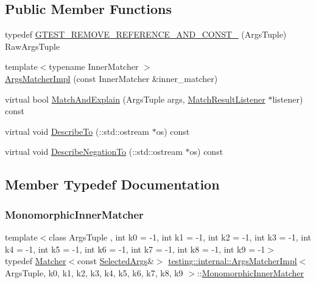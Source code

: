 \subsection*{Public Member Functions}
\begin{DoxyCompactItemize}
\item 
typedef \hyperlink{classtesting_1_1internal_1_1_args_matcher_impl_a7b0cadc369c0c20cd254cc2052782301}{G\+T\+E\+S\+T\+\_\+\+R\+E\+M\+O\+V\+E\+\_\+\+R\+E\+F\+E\+R\+E\+N\+C\+E\+\_\+\+A\+N\+D\+\_\+\+C\+O\+N\+S\+T\+\_\+} (Args\+Tuple) Raw\+Args\+Tuple
\item 
{\footnotesize template$<$typename Inner\+Matcher $>$ }\\\hyperlink{classtesting_1_1internal_1_1_args_matcher_impl_a7f7a9a826d130d11fe30633d79f59a06}{Args\+Matcher\+Impl} (const Inner\+Matcher \&inner\+\_\+matcher)
\item 
virtual bool \hyperlink{classtesting_1_1internal_1_1_args_matcher_impl_a60383b3073a61f9d82cbf31fe19e6bfa}{Match\+And\+Explain} (Args\+Tuple args, \hyperlink{classtesting_1_1_match_result_listener}{Match\+Result\+Listener} $\ast$listener) const
\item 
virtual void \hyperlink{classtesting_1_1internal_1_1_args_matcher_impl_a8e057f67b368f7d94aeb0ddd35837c94}{Describe\+To} (\+::std\+::ostream $\ast$os) const
\item 
virtual void \hyperlink{classtesting_1_1internal_1_1_args_matcher_impl_ac8ff5369879836567cedb5434bcca5b9}{Describe\+Negation\+To} (\+::std\+::ostream $\ast$os) const
\end{DoxyCompactItemize}


\subsection{Member Typedef Documentation}
\mbox{\label{classtesting_1_1internal_1_1_args_matcher_impl_ab90d2c074b2072d6c39bf26209fb941f}} 
\subsubsection{\texorpdfstring{Monomorphic\+Inner\+Matcher}{MonomorphicInnerMatcher}}
{\footnotesize\ttfamily template$<$class Args\+Tuple , int k0 = -\/1, int k1 = -\/1, int k2 = -\/1, int k3 = -\/1, int k4 = -\/1, int k5 = -\/1, int k6 = -\/1, int k7 = -\/1, int k8 = -\/1, int k9 = -\/1$>$ \\
typedef \hyperlink{classtesting_1_1_matcher}{Matcher}$<$const \hyperlink{classtesting_1_1internal_1_1_args_matcher_impl_ab061679f6251e56ccbedaf0c316d00ff}{Selected\+Args}\&$>$ \hyperlink{classtesting_1_1internal_1_1_args_matcher_impl}{testing\+::internal\+::\+Args\+Matcher\+Impl}$<$ Args\+Tuple, k0, k1, k2, k3, k4, k5, k6, k7, k8, k9 $>$\+::\hyperlink{classtesting_1_1internal_1_1_args_matcher_impl_ab90d2c074b2072d6c39bf26209fb941f}{Monomorphic\+Inner\+Matcher}}

